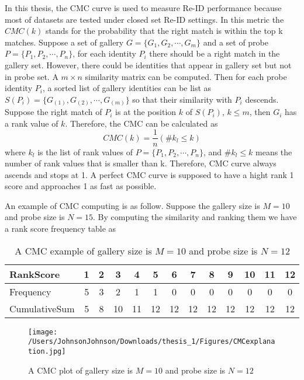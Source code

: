 In this thesis, the CMC curve is used to measure Re-ID performance because most of datasets are tested under closed set Re-ID settings. In this metric the $CMC(k)$ stands for the probability that the right match is within the top k matches. Suppose a set of gallery $G = \{G_1,G_2,\cdots,G_m\}$ and a set of probe $P = \{P_1,P_2,\cdots,P_n\}$, for each identity $P_i$ there should be a right match in the gallery set. However, there could be identities that appear in gallery set but not in probe set. A $m\times n$ similarity matrix can be computed. Then for each probe identity $P_i$, a sorted list of gallery identities can be list as $S(P_i) = \{{G_{(1)},G_{(2)},\cdots,G_{(m)}}\}$ so that their similarity with $P_i$ descends. Suppose the right match of $P_i$ is at the position $k$ of $S(P_i)$, $k\le m$, then $G_i$ has a rank value of $k$. Therefore, the CMC can be calculated as 
\begin{equation}
CMC(k) = \frac{1}{n}(\#k_l\le k)
\end{equation}
where $k_l$ is the list of rank values of $P = \{P_1,P_2,\cdots,P_n\}$, and $\#k_l\le k$ means the number of rank values that is smaller than k.  Therefore, CMC curve always ascends and stops at 1.  A perfect CMC curve is supposed to have a hight rank 1 score and approaches 1 as fast as possible.

An example of CMC computing is as follow. Suppose the gallery size is $M=10$ and probe size is $N=15$. By computing the similarity and ranking them we have a rank score frequency table as
\begin{table}[H]
\centering
\caption{A CMC example of gallery size is $M=10$ and probe size is $N=12$}
\begin{tabular}{|l|c|c|c|c|c|c|c|c|c|c|c|c|}
\hline
RankScore &1&2&3&4&5&6&7&8&9&10&11&12\\
\hline
Frequency &5&3&2&1&1&0&0&0&0&0&0&0\\
\hline
CumulativeSum&5&8&10&11&12&12&12&12&12&12&12&12\\
\hline
\end{tabular}
\end{table}

\begin{figure}[H]
\centering
\texttt{[image: /Users/JohnsonJohnson/Downloads/thesis\_1/Figures/CMCexplanation.jpg]}
\caption{A CMC plot of  gallery size is $M=10$ and probe size is $N=12$}
\label{CMCexplanationplot}
\vspace{-1em}
\end{figure} 






